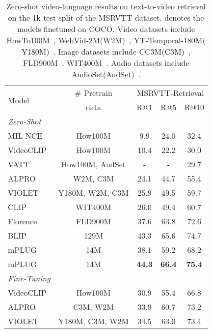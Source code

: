 \documentclass[11pt]{article}
\begin{document}
\begin{table}
\setlength\tabcolsep{1pt}
\small
\centering
\begin{tabular}{l|c|ccc}
\toprule
\multicolumn{1}{l|}{\multirow{2}{*}{Model}}  &
\multicolumn{1}{c|}{\# Pretrain} &
\multicolumn{3}{c}{MSRVTT-Retrieval} \\
  &  data & R@1 & R@5 & R@10  \\
\midrule
\multicolumn{5}{l}{\emph{Zero-Shot}} \\
\midrule
MIL-NCE~\cite{miech2020end} & How100M &9.9 & 24.0& 32.4\\
VideoCLIP~\cite{xu2021videoclip} & How100M &10.4 & 22.2& 30.0\\
VATT ~\cite{akbari2021vatt}& How100M, AudSet &- & -& 29.7\\
ALPRO ~\cite{li2021align_prompt}& W2M, C3M &24.1 &44.7 &55.4\\
VIOLET ~\cite{fu2021violet}& Y180M, W2M, C3M  &25.9 & 49.5 & 59.7\\
CLIP~\cite{radford2021learning} &WIT400M&26.0& 49.4& 60.7 \\
Florence ~\cite{yuan2021florence}& FLD900M &37.6 & 63.8 &72.6\\
BLIP  ~\cite{li2022blip} &129M  &43.3 & 65.6& 74.7\\
mPLUG &14M   & 38.1 & 59.2& 68.2\\
mPLUG  &14M   &\textbf{44.3}& \textbf{66.4} & \textbf{75.4}\\
\midrule
\multicolumn{5}{l}{\emph{Fine-Tuning}} \\
\midrule
VideoCLIP~\cite{xu2021videoclip} & How100M &30.9 & 55.4 & 66.8\\
ALPRO ~\cite{li2021align_prompt} & C3M, W2M & 33.9 & 60.7 & 73.2\\
VIOLET ~\cite{fu2021violet}& Y180M, C3M, W2M &34.5 & 63.0 & 73.4\\
\bottomrule
\end{tabular} 
\caption{Zero-shot video-language results on text-to-video retrieval on the 1k test split of the MSRVTT dataset.  denotes the models finetuned on COCO. Video datasets include HowTo100M~\cite{miech2019howto100m}, WebVid-2M(W2M)~\cite{bain2021frozen}, YT-Temporal-180M(   Y180M)~\cite{zellers2021merlot}. Image datasets include CC3M(C3M)~\cite{sharma2018conceptual}, FLD900M~\cite{yuan2021florence}, WIT400M~\cite{radford2021learning}. Audio datasets include AudioSet(AudSet)~\cite{gemmeke2017audio}.}
\label{table:video-retrieval-zeroshot}
\end{table}
\end{document}
